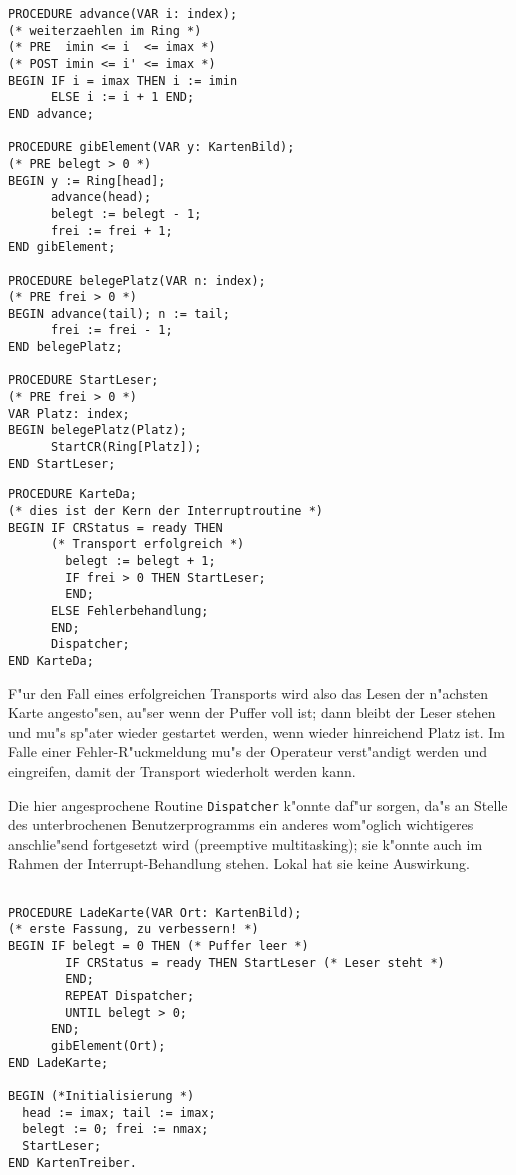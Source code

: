 \begin{verbatim}
PROCEDURE advance(VAR i: index);   
(* weiterzaehlen im Ring *)
(* PRE  imin <= i  <= imax *)
(* POST imin <= i' <= imax *)
BEGIN IF i = imax THEN i := imin
      ELSE i := i + 1 END;
END advance;

PROCEDURE gibElement(VAR y: KartenBild);
(* PRE belegt > 0 *)
BEGIN y := Ring[head];
      advance(head);
      belegt := belegt - 1;
      frei := frei + 1;
END gibElement;

PROCEDURE belegePlatz(VAR n: index);
(* PRE frei > 0 *)
BEGIN advance(tail); n := tail;
      frei := frei - 1;
END belegePlatz;

PROCEDURE StartLeser;
(* PRE frei > 0 *)
VAR Platz: index;
BEGIN belegePlatz(Platz);
      StartCR(Ring[Platz]);
END StartLeser;

\end{verbatim}

\begin{verbatim}
PROCEDURE KarteDa; 
(* dies ist der Kern der Interruptroutine *)
BEGIN IF CRStatus = ready THEN 
      (* Transport erfolgreich *)
        belegt := belegt + 1;
        IF frei > 0 THEN StartLeser;
        END;
      ELSE Fehlerbehandlung;
      END;
      Dispatcher;
END KarteDa;

\end{verbatim}

F"ur den Fall eines erfolgreichen Transports wird also das Lesen der
n"achsten Karte angesto"sen, au"ser wenn der Puffer voll ist; dann
bleibt der Leser stehen und mu"s sp"ater wieder gestartet werden,
wenn wieder hinreichend Platz ist. Im Falle einer Fehler-R"uckmeldung
mu"s der Operateur verst"andigt werden und eingreifen, damit der
Transport wiederholt werden kann.

Die hier angesprochene Routine {\tt Dispatcher} k"onnte daf"ur sorgen,
da"s an Stelle des unterbrochenen Benutzerprogramms ein anderes
wom"oglich wichtigeres anschlie"send fortgesetzt wird
(preemptive multitasking); sie k"onnte auch im Rahmen der
Interrupt-Behandlung stehen. Lokal hat sie keine Auswirkung.

\begin{verbatim}

PROCEDURE LadeKarte(VAR Ort: KartenBild);
(* erste Fassung, zu verbessern! *)
BEGIN IF belegt = 0 THEN (* Puffer leer *)
        IF CRStatus = ready THEN StartLeser (* Leser steht *)
        END;
        REPEAT Dispatcher;
        UNTIL belegt > 0;
      END;
      gibElement(Ort);
END LadeKarte;

BEGIN (*Initialisierung *)
  head := imax; tail := imax;
  belegt := 0; frei := nmax;
  StartLeser;
END KartenTreiber.

\end{verbatim}

